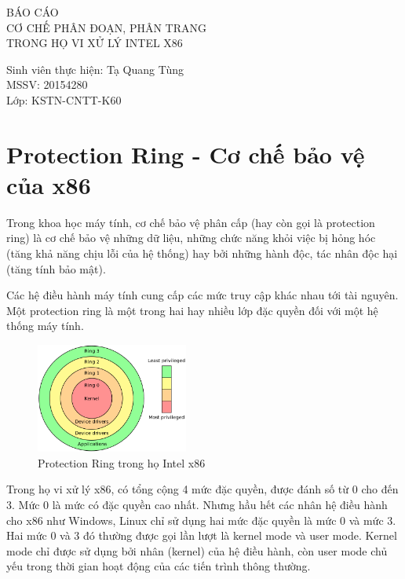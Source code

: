 \documentclass[12pt]{report}
\begin{document}
\vspace*{5cm}
\begin{LARGE}
\sffamily
\bfseries
\begin{center}
BÁO CÁO \\
CƠ CHẾ PHÂN ĐOẠN, PHÂN TRANG \\ 
TRONG HỌ VI XỬ LÝ INTEL X86
\end{center}
\end{LARGE}

\vspace*{2cm}
\begin{large}
\sffamily\bfseries
\begin{center}
Sinh viên thực hiện: Tạ Quang Tùng \\
MSSV: 20154280 \\
Lớp: KSTN-CNTT-K60
\end{center}
\end{large}

\newpage
\tableofcontents

\newpage

\section{Protection Ring - Cơ chế bảo vệ của x86}
Trong khoa học máy tính, cơ chế bảo vệ phân cấp (hay còn gọi là protection ring) là cơ chế bảo vệ những dữ liệu, những chức năng khỏi việc bị hỏng hóc (tăng khả năng chịu lỗi của hệ thống) hay bởi những hành độc, tác nhân độc hại (tăng tính bảo mật). \cite{protection_ring}  

Các hệ điều hành máy tính cung cấp các mức truy cập khác nhau tới tài nguyên. Một protection ring là một trong hai hay nhiều lớp đặc quyền đối với một hệ thống máy tính. 
\begin{figure}[h]
\centering
\caption{Protection Ring trong họ Intel x86}
\includegraphics[width=5cm]{protection_ring.png}
\end{figure}

Trong họ vi xử lý x86, có tổng cộng 4 mức đặc quyền, được đánh số từ 0 cho đến 3. Mức 0 là mức có đặc quyền cao nhất. Nhưng hầu hết các nhân hệ điều hành cho x86 như Windows, Linux chỉ sử dụng hai mức đặc quyền là mức 0 và mức 3. Hai mức 0 và 3 đó thường được gọi lần lượt là kernel mode và user mode. Kernel mode chỉ được sử dụng bởi nhân (kernel) của hệ điều hành, còn user mode chủ yếu trong thời gian hoạt động của các tiến trình thông thường.
\end{document}
